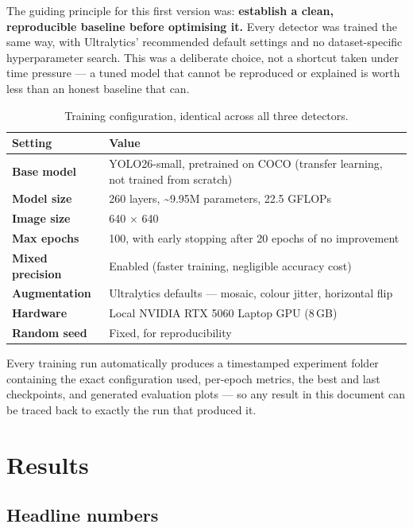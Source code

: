 \documentclass[11pt,a4paper]{article}
\begin{document}
The guiding principle for this first version was: \textbf{establish a clean, reproducible
baseline before optimising it.} Every detector was trained the same way, with Ultralytics'
recommended default settings and no dataset-specific hyperparameter search. This was a
deliberate choice, not a shortcut taken under time pressure --- a tuned model that cannot be
reproduced or explained is worth less than an honest baseline that can.

\begin{table}[h]
\centering
\renewcommand{\arraystretch}{1.3}
\begin{tabular}{@{}>{\bfseries}p{3.1cm} p{11cm}@{}}
\toprule
\textbf{Setting} & \textbf{Value} \\
\midrule
Base model & YOLO26-small, pretrained on COCO (transfer learning, not trained from scratch) \\
Model size & 260 layers, \textasciitilde 9.95M parameters, 22.5 GFLOPs \\
Image size & 640 $\times$ 640 \\
Max epochs & 100, with early stopping after 20 epochs of no improvement \\
Mixed precision & Enabled (faster training, negligible accuracy cost) \\
Augmentation & Ultralytics defaults --- mosaic, colour jitter, horizontal flip \\
Hardware & Local NVIDIA RTX 5060 Laptop GPU (8\,GB) \\
Random seed & Fixed, for reproducibility \\
\bottomrule
\end{tabular}
\caption{Training configuration, identical across all three detectors.}
\end{table}

Every training run automatically produces a timestamped experiment folder containing the exact
configuration used, per-epoch metrics, the best and last checkpoints, and generated evaluation
plots --- so any result in this document can be traced back to exactly the run that produced it.

\section{Results}

\subsection{Headline numbers}
\end{document}
